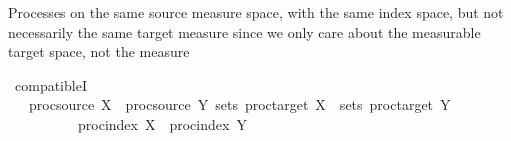 \begin{isabellebody}
{}%
%
\begin{isamarkuptext}%
Processes on the same source measure space, with the same index space, but not necessarily the same
  target measure since we only care about the measurable target space, not the measure%
\end{isamarkuptext}\isamarkuptrue%
%
\isamarkupfalse%
\ compatibleI{\isacharcolon}{\kern0pt}\isanewline
\ \ \ {\isachardoublequoteopen}proc{\isacharunderscore}{\kern0pt}source\ X\ {\isacharequal}{\kern0pt}\ proc{\isacharunderscore}{\kern0pt}source\ Y{\isachardoublequoteclose}\ {\isachardoublequoteopen}sets\ {\isacharparenleft}{\kern0pt}proc{\isacharunderscore}{\kern0pt}target\ X{\isacharparenright}{\kern0pt}\ {\isacharequal}{\kern0pt}\ sets\ {\isacharparenleft}{\kern0pt}proc{\isacharunderscore}{\kern0pt}target\ Y{\isacharparenright}{\kern0pt}{\isachardoublequoteclose}\isanewline
\ \ \ \ \ \ \ \ \ \ {\isachardoublequoteopen}proc{\isacharunderscore}{\kern0pt}index\ X\ {\isacharequal}{\kern0pt}\ proc{\isacharunderscore}{\kern0pt}index\ Y{\isachardoublequoteclose}\isanewline

\end{isabellebody}
